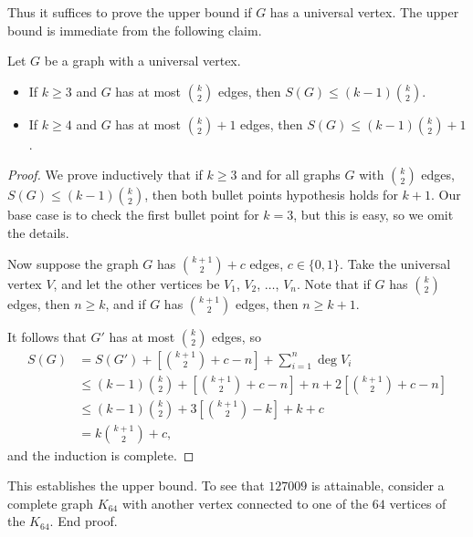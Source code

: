 Thus it suffices to prove the upper bound if $G$ has a universal vertex. The upper bound is immediate from the following claim.
\begin{claim}
    Let $G$ be a graph with a universal vertex.
    \begin{itemize}
        \item If $k\ge3$ and $G$ has at most $\binom k2$ edges, then $S(G)\le(k-1)\binom k2$.
        \item If $k\ge4$ and $G$ has at most $\binom k2+1$ edges, then $S(G)\le(k-1)\binom k2+1$.
    \end{itemize}
\end{claim}
\begin{proof}
    We prove inductively that if $k\ge3$ and for all graphs $G$ with $\binom k2$ edges, $S(G)\le(k-1)\binom k2$, then both bullet points hypothesis holds for $k+1$. Our base case is to check the first bullet point for $k=3$, but this is easy, so we omit the details.

    Now suppose the graph $G$ has $\binom{k+1}2+c$ edges, $c\in\{0,1\}$. Take the universal vertex $V$, and let the other vertices be $V_1$, $V_2$, $\ldots$, $V_n$. Note that if $G$ has $\binom k2$ edges, then $n\ge k$, and if $G$ has $\binom{k+1}2$ edges, then $n\ge k+1$.

    It follows that $G'$ has at most $\binom k2$ edges, so
    \begin{align*}
        S(G)&=S(G')+\left[\binom{k+1}2+c-n\right]+\sum_{i=1}^n\deg V_i\\
        &\le(k-1)\binom k2+\left[\binom{k+1}2+c-n\right]+n+2\left[\binom{k+1}2+c-n\right]\\
        &\le(k-1)\binom k2+3\left[\binom{k+1}2-k\right]+k+c\\
        &=k\binom{k+1}2+c,
    \end{align*}
    and the induction is complete.
\end{proof}

This establishes the upper bound. To see that $127009$ is attainable, consider a complete graph $K_{64}$ with another vertex connected to one of the $64$ vertices of the $K_{64}$. End proof.
